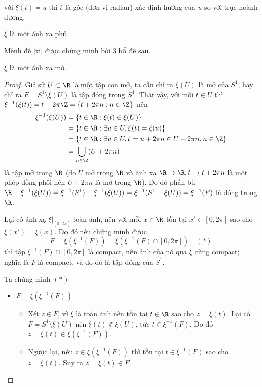 	\begin{remark} với $\xi(t) = u$ thì $t$ là góc (đơn vị radian) xác định hướng của $u$ so với trục hoành dương.
	\end{remark}
	\begin{proposition}\label{xi}
	$\xi$ là một ánh xạ phủ.
	\end{proposition}
	Mệnh đề \ref{xi} được chứng minh bởi 3 bổ đề sau.
	\begin{lemma}
		$\xi$ là một ánh xạ mở.
	\end{lemma}
	\begin{proof}
		Giả sử $U \subset \R$ là một tập con mở, ta cần chỉ ra $\xi(U)$ là mở của $S^1$, hay chỉ ra $F = S^1 \setminus \xi(U)$ là tập đóng trong $S^1$. Thật vậy, với mỗi $t\in U$ thì $\xi^{-1}(\xi(t))=t+2\pi\Z =  \{t+2\pi n:n\in \Z\}$ nên 
		\begin{align*}
			\xi^{-1}(\xi(U)) &=  \{t\in \R: \xi(t)\in \xi(U)\} \\
			&= \{t\in \R: \exists u \in U, \xi(t)=\xi(u)\}\\
			&= \{t\in \R: \exists u\in U, t = u+2\pi n \in U+2\pi n, n\in \Z\}\\
			&=\bigcup_{n \in \Z} (U + 2\pi n)
		\end{align*}
		là tập mở trong $\R$ (do $U$ mở trong $\R$ và ánh xạ $\R\to \R, t\mapsto t+2\pi n$ là một phép đồng phôi nên $U+2\pi n$ là mở trong $\R$). Do đó phần bù $\R-\xi^{-1}(\xi(U))=\xi^{-1}(S^1)-\xi^{-1}(\xi(U))=\xi^{-1}(S^1-\xi(U))=\xi^{-1}(F)$ là đóng trong $\R$. 
		
		Lại có ánh xạ $\xi|_{[0, 2\pi]}$ toàn ánh, nên với mỗi $x \in \R$ tồn tại $x' \in [0, 2\pi]$ sao cho $\xi(x') = \xi(x)$. Do đó nếu chứng minh được
		\[
		F = \xi(\xi^{-1}(F)) = \xi(\xi^{-1}(F) \cap [0, 2\pi])\quad (*)
		\]
		thì tập $\xi^{-1}(F) \cap [0, 2\pi]$ là compact, nên ảnh của nó qua $\xi$ cũng compact; nghĩa là $F$ là compact, và do đó là tập đóng của $S^1$.
		
		Ta chứng minh $(*)$
		\begin{itemize}
			\item $F=\xi(\xi^{-1}(F))$
			\begin{itemize}
				\item Xét $z\in F$, vì $\xi$ là toàn ánh nên tồn tại $t\in \R$ sao cho $z=\xi(t)$. Lại có $F=S^1\setminus\xi(U)$ nên $\xi(t)\notin \xi(U)$, tức $t\in \xi^{-1}(F)$. Do đó $z=\xi(t)\in \xi(\xi^{-1}(F))$.
				
				\item Ngược lại, nếu $z\in \xi(\xi^{-1}(F))$ thì tồn tại $t\in \xi^{-1}(F)$ sao cho $z=\xi(t)$. Suy ra $z=\xi(t)\in F$. 
			\end{itemize}
			

\end{itemize}
\end{proof}
